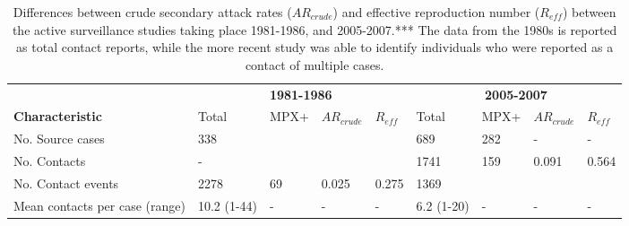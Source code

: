 

\begin{table} %
\centering %
\caption{Differences between crude secondary attack rates ($AR_{crude}$) and effective reproduction number ($R_{eff}$) between the active surveillance studies taking place 1981-1986, and 2005-2007.*** The data from the 1980s is reported as total contact reports, while the more recent study was able to identify individuals who were reported as a contact of multiple cases.} %
\begin{tabular}{p{3.2cm}p{1.1cm}p{1cm}p{1cm}p{1.1cm}p{1.1cm}p{1cm}p{1cm}p{1.1cm}} %
\toprule %
& \multicolumn{4}{c}{\textbf{1981-1986}} & \multicolumn{4}{c}{\textbf{2005-2007}}\\ %
\cmidrule(l){2-5} \cmidrule(l){6-9} %

\textbf{Characteristic} & Total & MPX+ & $AR_{crude}$ & $R_{eff}$ & Total & MPX+ & $AR_{crude}$ & $R_{eff}$ \\ %
\midrule %
No. Source cases & 338 & & & & 689 & 282 & - & - \\ %
No. Contacts & - & & & & 1741 & 159 & 0.091 & 0.564 \\ %
No. Contact events & 2278 & 69 & 0.025 & 0.275 & 1369 & & & \\ [0.1cm]
Mean contacts per case (range) & 10.2 (1-44) & - & - & - & 6.2 (1-20) & - & - & - \\ 
\bottomrule %
\end{tabular}
\end{table}

